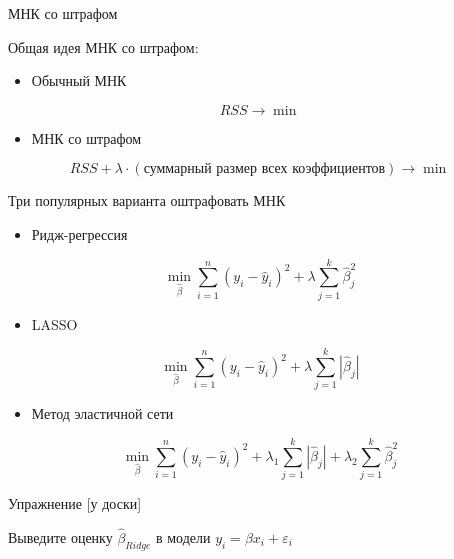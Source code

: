 \documentclass[ignorenonframetext,]{beamer}
\begin{document}
\begin{frame}{МНК со штрафом}

Общая идея МНК со штрафом:

\begin{itemize}
\itemsep1pt\parskip0pt
\item
  Обычный МНК
\end{itemize}

\[
RSS \to \min
\]

\begin{itemize}
\itemsep1pt\parskip0pt
\item
  МНК со штрафом
\end{itemize}

\[
RSS + \lambda \cdot (\text{суммарный размер всех коэффициентов}) \to \min
\]

\end{frame}

\begin{frame}{Три популярных варианта оштрафовать МНК}

\begin{itemize}
\itemsep1pt\parskip0pt
\item
  Ридж-регрессия
\end{itemize}

\[
\min_{\hat{\beta}} \sum_{i=1}^n (y_i-\hat{y}_i)^2 + \lambda \sum_{j=1}^k \hat{\beta}_j^2
\]

\begin{itemize}
\itemsep1pt\parskip0pt
\item
  LASSO
\end{itemize}

\[
\min_{\hat{\beta}} \sum_{i=1}^n (y_i-\hat{y}_i)^2 + \lambda \sum_{j=1}^k |\hat{\beta}_j|
\]

\begin{itemize}
\itemsep1pt\parskip0pt
\item
  Метод эластичной сети
\end{itemize}

\[
\min_{\hat{\beta}} \sum_{i=1}^n (y_i-\hat{y}_i)^2 + \lambda_1 \sum_{j=1}^k |\hat{\beta}_j| + \lambda_2 \sum_{j=1}^k \hat{\beta}_j^2
\]

\end{frame}

\begin{frame}{Упражнение {[}у доски{]}}

Выведите оценку \(\hat{\beta}_{Ridge}\) в модели
\(y_i=\beta x_i + \varepsilon_i\)

\end{frame}
\end{document}
